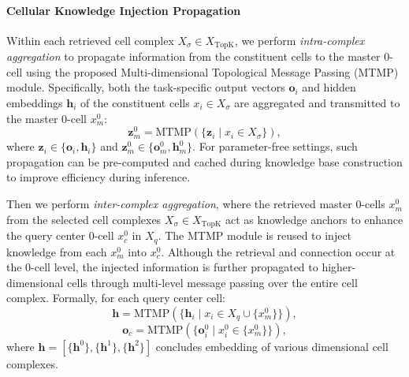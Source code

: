 \paragraph{Cellular Knowledge Injection Propagation} 
Within each retrieved cell complex $X_\sigma \in X_{\text{TopK}}$, we perform \textit{intra-complex aggregation} to propagate information from the constituent cells to the master 0-cell using the proposed Multi-dimensional Topological Message Passing (MTMP) module. Specifically, both the task-specific output vectors $\bm{o}_i$ and hidden embeddings $\bm{h}_i$ of the constituent cells $x_i \in X_\sigma$ are aggregated and transmitted to the master 0-cell $x_m^0$:
\begin{equation}
\mathbf{z}_m^0 = \text{MTMP}\left( \{\mathbf{z}_i \mid x_i \in X_\sigma\} \right),
\end{equation}
where \( \mathbf{z}_i \in \{\bm{o}_i, \bm{h}_i\} \) and \( \mathbf{z}_m^0 \in \{\bm{o}_m^0, \bm{h}_m^0\} \). For parameter-free settings, such propagation can be pre-computed and cached during knowledge base construction to improve efficiency during inference.

Then we perform \textit{inter-complex aggregation}, where the retrieved master 0-cells \( x_m^0 \) from the selected cell complexes \( X_\sigma \in X_{\text{TopK}} \) act as knowledge anchors to enhance the query center 0-cell \( x_c^0 \) in \( X_q \). The \textsc{MTMP} module is reused to inject knowledge from each \( x_m^0 \) into \( x_c^0 \). Although the retrieval and connection occur at the 0-cell level, the injected information is further propagated to higher-dimensional cells through multi-level message passing over the entire cell complex. Formally, for each query center cell:
\begin{equation}
\bm{h} = \text{MTMP}\left( \{ \bm{h}_i \mid x_i \in X_q \cup \{x_m^0\} \} \right),
\end{equation}
\begin{equation}
\bm{o}_c = \text{MTMP}\left( \{ \bm{o}_i^0 \mid x_i^0 \in \{x_m^0\} \} \right),
\end{equation}
where $\bm{h}=[\{\bm{h}^0\},\{\bm{h}^1\},\{\bm{h}^2\}]$ concludes embedding of various dimensional cell complexes.

